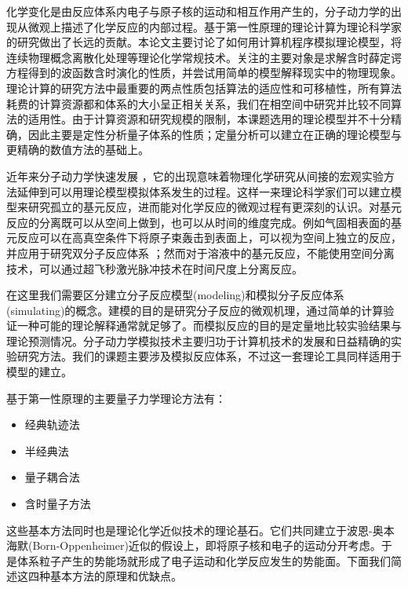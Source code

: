 
化学变化是由反应体系内电子与原子核的运动和相互作用产生的，分子动力学的出现从微观上描述了化学反应的内部过程。基于第一性原理的理论计算为理论科学家的研究做出了长远的贡献。本论文主要讨论了如何用计算机程序模拟理论模型，将连续物理概念离散化处理等理论化学常规技术。关注的主要对象是求解含时薛定谔方程得到的波函数含时演化的性质，并尝试用简单的模型解释现实中的物理现象。理论计算的研究方法中最重要的两点性质包括算法的适应性和可移植性，所有算法耗费的计算资源都和体系的大小呈正相关关系，我们在相空间中研究并比较不同算法的适用性。由于计算资源和研究规模的限制，本课题选用的理论模型并不十分精确，因此主要是定性分析量子体系的性质；定量分析可以建立在正确的理论模型与更精确的数值方法的基础上。

近年来分子动力学快速发展\cite{ab_initio} ，它的出现意味着物理化学研究从间接的宏观实验方法延伸到可以用理论模型模拟体系发生的过程。这样一来理论科学家们可以建立模型来研究孤立的基元反应，进而能对化学反应的微观过程有更深刻的认识。对基元反应的分离既可以从空间上做到，也可以从时间的维度完成。例如气固相表面的基元反应可以在高真空条件下将原子束轰击到表面上\cite{molecular_beam}，可以视为空间上独立的反应，并应用于研究双分子反应体系\cite{bimolecular_reaction_1,bimolecular_reaction_2} ；然而对于溶液中的基元反应，不能使用空间分离技术，可以通过超飞秒激光脉冲技术在时间尺度上分离反应\cite{femto_isolation}。

在这里我们需要区分建立分子反应模型(modeling)和模拟分子反应体系(simulating)的概念。建模的目的是研究分子反应的微观机理，通过简单的计算验证一种可能的理论解释通常就足够了。而模拟反应的目的是定量地比较实验结果与理论预测情况。分子动力学模拟技术主要归功于计算机技术的发展和日益精确的实验研究方法。我们的课题主要涉及模拟反应体系，不过这一套理论工具同样适用于模型的建立。

基于第一性原理的主要量子力学理论方法有：
\begin{multicols}{2}
\begin{itemize}
  \item 经典轨迹法
  \item 半经典法
  \item 量子耦合法
  \item 含时量子方法
\end{itemize}
\end{multicols}
这些基本方法同时也是理论化学近似技术的理论基石。它们共同建立于波恩-奥本海默(Born-Oppenheimer)近似\cite{BO_approx}的假设上，即将原子核和电子的运动分开考虑。于是体系粒子产生的势能场就形成了电子运动和化学反应发生的势能面。下面我们简述这四种基本方法的原理和优缺点。

